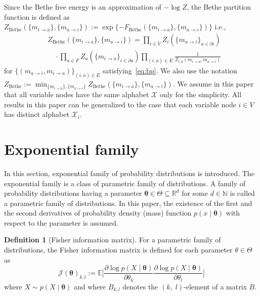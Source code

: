 \documentclass[a4paper,10pt,twoside,twocolumn,openany,final]{memoir}
\theoremstyle{plain}
\theoremstyle{definition}
\newtheorem{definition}[theorem]{Definition}
\theoremstyle{remark}
\begin{document}
Since the Bethe free energy is an approximation of $-\log Z$, the Bethe partition function is defined as
$Z_\mathrm{Bethe}(\{m_{i\to a}\}, \{m_{a\to i}\}) := \exp\{-F_\mathrm{Bethe}(\{m_{i\to a}\}, \{m_{a\to i}\})\}$
i.e.,
\begin{align*}
&Z_\mathrm{Bethe}(\{m_{i\to a}\}, \{m_{a\to i}\}) = 
\prod_{i\in V} Z_i(\{m_{a\to i}\}_{a\in\partial i})\\
&\quad\cdot\prod_{a\in F} Z_a(\{m_{i\to a}\}_{i\in\partial a})
\prod_{(i,a)\in E} \frac1{Z_{i,a}(m_{i\to a}, m_{a\to i})}
\end{align*}
for $\{(m_{a\to i}, m_{i\to a})\}_{(i,a)\in E}$ satisfying~\eqref{eq:bp}.
We also use the notation $Z_\mathrm{Bethe}:= \min_{\{m_{i\to a}\}, \{m_{a\to i}\}} Z_\mathrm{Bethe}(\{m_{i\to a}\}, \{m_{a\to i}\})$.
We assume in this paper that all variable nodes have the same alphabet $\mathcal{X}$ 
only for the simplicity.
All results in this paper can be generalized to the case that each variable node $i\in V$ has distinct alphabet $\mathcal{X}_i$.

\section{Exponential family}
In this section, exponential family of probability distributions is introduced.
The exponential family is a class of parametric family of distributions.
A family of probability distributions having a parameter $\bm{\theta}\in\Theta\subseteq\mathbb{R}^d$ for some $d\in\mathbb{N}$
is called a parametric family of distributions.
In this paper, the existence of the first and the second derivatives of probability density (mass) function $p(x\mid \bm{\theta})$
with respect to the parameter is assumed.
\begin{definition}[Fisher information matrix]
For a parametric family of distributions,
the Fisher information matrix is defined for each parameter $\theta\in\Theta$ as
\begin{equation*}
\mathcal{J}(\bm{\theta})_{k,l} := 
\mathbb{E}\bigg[\frac{\partial \log p(X\mid \bm{\theta})}{\partial \theta_k}\frac{\partial \log p(X\mid \bm{\theta})}{\partial \theta_l}\bigg]
\end{equation*}
where $X\sim p(X\mid \bm{\theta})$ and where ${B}_{k,l}$ denotes the $(k,\;l)$-element of a matrix $B$.
\end{definition}
\end{document}
